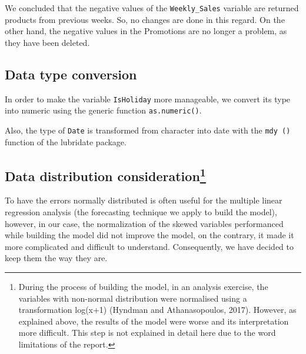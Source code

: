 \documentclass[11pt,]{article}
\newenvironment{Shaded}{\begin{snugshade}}{\end{snugshade}}
\newcommand{\KeywordTok}[1]{\textcolor[rgb]{0.13,0.29,0.53}{\textbf{{#1}}}}
\newcommand{\StringTok}[1]{\textcolor[rgb]{0.31,0.60,0.02}{{#1}}}
\newcommand{\CommentTok}[1]{\textcolor[rgb]{0.56,0.35,0.01}{\textit{{#1}}}}
\newcommand{\NormalTok}[1]{{#1}}
\let\rmarkdownfootnote\footnote%
\def\footnote{\protect\rmarkdownfootnote}
\begin{document}
We concluded that the negative values of the \texttt{Weekly\_Sales}
variable are returned products from previous weeks. So, no changes are
done in this regard. On the other hand, the negative values in the
Promotions are no longer a problem, as they have been deleted.

\subsection{Data type conversion}\label{data-type-conversion}

In order to make the variable \texttt{IsHoliday} more manageable, we
convert its type into numeric using the generic function
\texttt{as.numeric()}.

\begin{Shaded}
\end{Shaded}

Also, the type of \texttt{Date} is transformed from character into date
with the \texttt{mdy\ ()} function of the lubridate package.

\begin{Shaded}
\end{Shaded}

\subsection[Data distribution consideration]{\texorpdfstring{Data
distribution consideration\footnote{During the process of building the
  model, in an analysis exercise, the variables with non-normal
  distribution were normalised using a transformation log(x+1) (Hyndman
  and Athana­sopou­los, 2017). However, as explained above, the results
  of the model were worse and its interpretation more difficult. This
  step is not explained in detail here due to the word limitations of
  the report.}}{Data distribution consideration}}\label{data-distribution-consideration}

To have the errors normally distributed is often useful for the multiple
linear regression analysis (the forecasting technique we apply to build
the model), however, in our case, the normalization of the skewed
variables performanced while building the model did not improve the
model, on the contrary, it made it more complicated and difficult to
understand. Consequently, we have decided to keep them the way they are.
\end{document}
